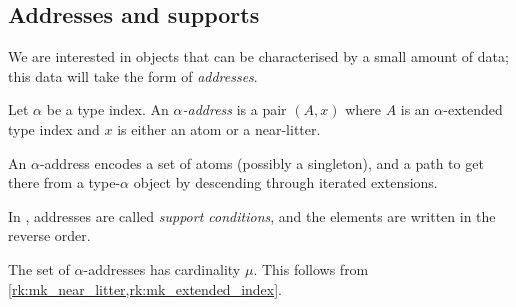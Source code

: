 \subsection{Addresses and supports}

We are interested in objects that can be characterised by a small amount of data; this data will take the form of \emph{addresses}.
\begin{definition}
    Let \( \alpha \) be a type index.
    An \emph{\( \alpha \)-address} is a pair \( (A, x) \) where \( A \) is an \( \alpha \)-extended type index and \( x \) is either an atom or a near-litter.
\end{definition}
An \( \alpha \)-address encodes a set of atoms (possibly a singleton), and a path to get there from a type-\( \alpha \) object by descending through iterated extensions.
\begin{note}
    In \cite{holmes2023nf}, addresses are called \emph{support conditions}, and the elements are written in the reverse order.
\end{note}
\begin{remark}
    \label{rk:mk_address}
    The set of \( \alpha \)-addresses has cardinality \( \mu \).
    This follows from \cref{rk:mk_near_litter,rk:mk_extended_index}.
\end{remark}

